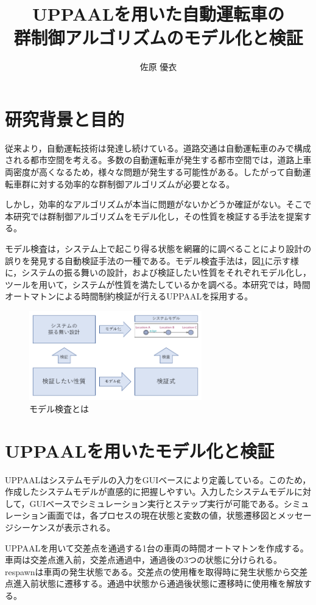 \documentclass[10pt]{tpu-abst-utf}
\author{佐原 優衣}
\title{UPPAALを用いた自動運転車の\\群制御アルゴリズムのモデル化と検証}
\begin{document}
%
\maketitle
%
%
\section{研究背景と目的}
従来より，自動運転技術は発達し続けている。道路交通は自動運転車のみで構成される都市空間を考える。多数の自動運転車が発生する都市空間では，道路上車両密度が高くなるため，様々な問題が発生する可能性がある。したがって自動運転車群に対する効率的な群制御アルゴリズムが必要となる。
	
しかし，効率的なアルゴリズムが本当に問題がないかどうか確証がない。そこで本研究では群制御アルゴリズムをモデル化し，その性質を検証する手法を提案する。

モデル検査は，システム上で起こり得る状態を網羅的に調べることにより設計の誤りを発見する自動検証手法の一種である。モデル検査手法は，図\ref{ModelV}に示す様に，システムの振る舞いの設計，および検証したい性質をそれぞれモデル化し，ツールを用いて，システムが性質を満たしているかを調べる。本研究では，時間オートマトンによる時間制約検証が行えるUPPAALを採用する。
	\begin{figure}[htbp]
	\centering
	\includegraphics[width=75mm]{ModelVerification.png}
	\caption{モデル検査とは}
	\label{ModelV}
	\end{figure}
\section{UPPAALを用いたモデル化と検証}
UPPAALはシステムモデルの入力をGUIベースにより定義している。このため，作成したシステムモデルが直感的に把握しやすい。入力したシステムモデルに対して，GUIベースでシミュレーション実行とステップ実行が可能である。シミュレーション画面では，各プロセスの現在状態と変数の値，状態遷移図とメッセージシーケンスが表示される。

UPPAALを用いて交差点を通過する1台の車両の時間オートマトンを作成する。車両は交差点進入前，交差点通過中，通過後の3つの状態に分けられる。respawnは車両の発生状態である。交差点の使用権を取得時に発生状態から交差点進入前状態に遷移する。通過中状態から通過後状態に遷移時に使用権を解放する。
\end{document}
